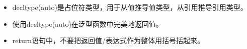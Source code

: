 \begin{itemize}
	\item decltype(auto)是占位符类型，用于从值推导值类型，从引用推导引用类型。
	\item 使用decltype(auto)在泛型函数中完美地返回值。
	\item return语句中，不要把返回值/表达式作为整体用括号括起来。
\end{itemize}


